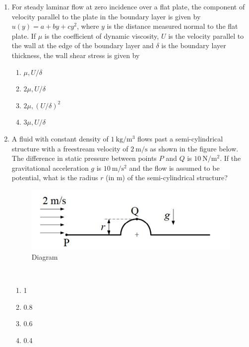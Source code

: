 \documentclass[journal,12pt,onecolumn]{IEEEtran}
\begin{document}
\begin{enumerate}[label=\arabic*)]
\item For steady laminar flow at zero incidence over a flat plate, the component of velocity parallel to the plate in the boundary layer is given by $u(y)=a+b y+c y^2$, where $y$ is the distance measured normal to the flat plate. If $\mu$ is the coefficient of dynamic viscosity, $U$ is the velocity parallel to the wall at the edge of the boundary layer and $\delta$ is the boundary layer thickness, the wall shear stress is given by
\hfill{} \\

\vspace{0.1cm}
\begin{enumerate}[label=\alph*)]
\item $\mu,U/\delta$
\item $2\mu,U/\delta$
\item $2\mu,(U/\delta)^2$
\item $3\mu,U/\delta$
\end{enumerate}

\newpage

\item A fluid with constant density of $1\ \mathrm{kg/m^3}$ flows past a semi-cylindrical structure with a freestream velocity of $2\ \mathrm{m/s}$ as shown in the figure below. The difference in static pressure between points $P$ and $Q$ is $10\ \mathrm{N/m^2}$. If the gravitational acceleration $g$ is $10\ \mathrm{m/s^2}$ and the flow is assumed to be potential, what is the radius $r$ (in m) of the semi-cylindrical structure?

\begin{figure}[htbp]
  \centering
  \includegraphics[width=.55\linewidth]{figs/B/fig2.png}
  \caption{Diagram}
  \label{B/fig2}
\end{figure}
\hfill{} \\

\vspace{0.2cm}
\begin{enumerate}[label=\alph*)]
\item 1
\item 0.8
\item 0.6
\item 0.4
\end{enumerate}




\end{enumerate}
\end{document}
